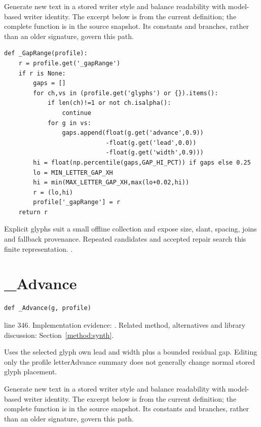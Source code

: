 Generate new text in a stored writer style and balance readability with model-based writer identity. The excerpt below is from the current definition; the complete function is in the source snapshot. Its constants and branches, rather than an older signature, govern this path.


\begin{lstlisting}[style=plain]
def _GapRange(profile):
    r = profile.get('_gapRange')
    if r is None:
        gaps = []
        for ch,vs in (profile.get('glyphs') or {}).items():
            if len(ch)!=1 or not ch.isalpha():
                continue
            for g in vs:
                gaps.append(float(g.get('advance',0.9))
                            -float(g.get('lead',0.0))
                            -float(g.get('width',0.9)))
        hi = float(np.percentile(gaps,GAP_HI_PCT)) if gaps else 0.25
        lo = MIN_LETTER_GAP_XH
        hi = min(MAX_LETTER_GAP_XH,max(lo+0.02,hi))
        r = (lo,hi)
        profile['_gapRange'] = r
    return r
\end{lstlisting}
Explicit glyphs suit a small offline collection and expose size, slant, spacing, joins and fallback provenance. Repeated candidates and accepted repair search this finite representation. \cite{haines2016,gravesgenerate,ganwriting,onedm}.


\section{\_Advance}\label{fn:synthesise:-Advance}
\begin{lstlisting}[style=sig]
def _Advance(g, profile)
\end{lstlisting}
 line 346. Implementation evidence: \cite{code2026}. Related method, alternatives and library discussion: Section~\ref{method:synth}.


Uses the selected glyph own lead and width plus a bounded residual gap. Editing only the profile letterAdvance summary does not generally change normal stored glyph placement.


Generate new text in a stored writer style and balance readability with model-based writer identity. The excerpt below is from the current definition; the complete function is in the source snapshot. Its constants and branches, rather than an older signature, govern this path.


